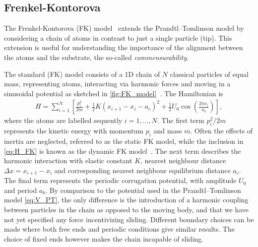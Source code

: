 



\subsection{Frenkel-Kontorova}

The Frenkel-Kontorova (\acrshort{FK}) model~\cite{Frenkel_1938} extends the Prandtl–Tomlinson model by considering a chain of atoms in contrast to just a single particle (tip). This extension is useful for understanding the importance of the alignment between the atoms and the substrate, the so-called \textit{commensurability}.

The standard (\acrshort{FK}) model consists of a 1D chain of $N$ classical particles of equal mass, representing atoms, interacting via harmonic forces and moving in a sinusoidal potential as sketched in \cref{fig:FK_model}~\cite{Manini_2016}. The Hamiltonian is 
\begin{align}
  H = \sum_{i=1}^N \left[\frac{p_i^2}{2m} + \frac{1}{2}K(x_{i+1} - x_i - a_c)^2 + \frac{1}{2}U_0 \cos{\left(\frac{2\pi x_i}{a_b}\right)}\right],
  \label{eq:H_FK}
\end{align}
where the atoms are labelled sequently $i = 1, \hdots, N$. The first term $p_i^2/2m$ represents the kinetic energy with momentum $p_i$
and mass $m$. Often the effects of inertia are neglected, referred to as the static \acrshort{FK} model, while the inclusion in \cref{eq:H_FK} is known as the dynamic \acrshort{FK} model~\cite{FK2D}. The next term describes the harmonic interaction with elastic
constant $K$, nearest neighbour distance $\Delta x = x_{i+1} - x_i$ and 
corresponding nearest neighbour equilibrium distance $a_c$. The final term represents the periodic corrugation potential, with amplitude $U_0$ and period $a_b$. By comparison to the potential used in the Prandtl–Tomlinson model \cref{eq:V_PT}, the only difference is the introduction of a harmonic coupling between particles in the chain as opposed to the moving body, and that we have not yet specified any force incentivizing sliding. Different boundary choices can be made where both free ends and periodic conditions give similar results. The choice of fixed ends however makes the chain incapable of sliding.

